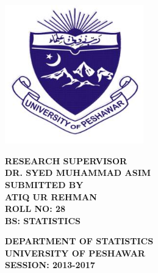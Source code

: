 \documentclass[12pt, a4paper, oneside]{Thesis} %
\begin{document}
\begin{titlepage}
\begin{center}


{\huge \bfseries \ttitle}\\[2cm] %

\includegraphics[width=6cm]{Logo}\\ \hfill \break
 
%

% 
\begin{singlespace*}
\onehalfspacing
\normalsize{\bf{RESEARCH SUPERVISOR \\ DR. SYED MUHAMMAD ASIM}}\\ \hfill \break 
\normalsize{\bf{SUBMITTED BY \\ ATIQ UR REHMAN}}\\
\normalsize{\bf{ROLL NO: 28\\ BS: STATISTICS}}\\[3cm] 
\end{singlespace*}
 \begin{singlespace*}
\onehalfspacing
\large{\bf{DEPARTMENT OF STATISTICS\\ UNIVERSITY OF PESHAWAR \\ SESSION: 2013-2017}}
\end{singlespace*}
 



\end{center}
\end{titlepage}
\end{document}
